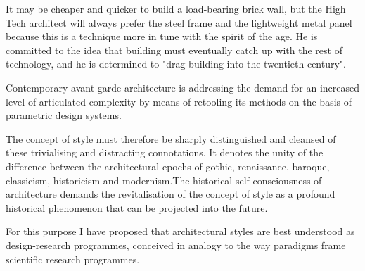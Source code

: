 



It may be cheaper and quicker to build a load-bearing brick wall, but
the High Tech architect will always prefer the steel frame and the lightweight metal panel because this is a technique more in tune with the spirit of the age.
He is committed to the idea that building must eventually catch up with the rest of technology, and he is determined to "drag building into the twentieth century".\cite{Davies1988}

Contemporary avant-garde architecture is addressing the demand for an increased level of
articulated complexity by means of retooling its methods on the basis of parametric design
systems.\cite{Schumacher2008}

The concept of style must therefore be sharply distinguished and cleansed of these
trivialising and distracting connotations.
It denotes the unity of the difference between the architectural epochs of gothic, renaissance, baroque, classicism, historicism and modernism.The historical self-consciousness of architecture demands the revitalisation of the concept of style as a profound historical phenomenon that can be projected into the future.\cite{Schumacher2010}


For this purpose I have proposed that architectural styles are best understood as design-research programmes, conceived in analogy to the way paradigms frame scientific research programmes. \cite{Schumacher2010}

